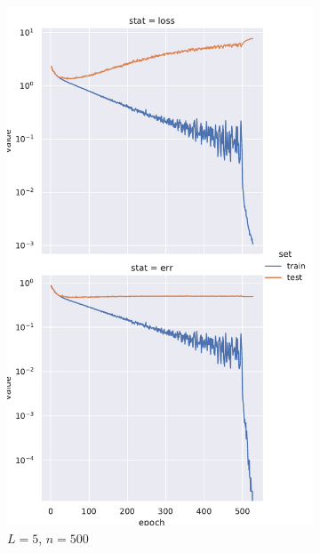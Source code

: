 \documentclass[a4paper]{article}
\begin{document}
\begin{figure}[!ht]
    \centering
    \begin{subfigure}{0.24\textwidth}
        \centering
    \includegraphics[width=\columnwidth]{cifar10/L_5_w_100}
    \caption{$L = 5$, $n = 500$}
\end{subfigure}
\begin{subfigure}{0.24\textwidth}
    \centering

\end{subfigure}
\end{figure}
\end{document}
